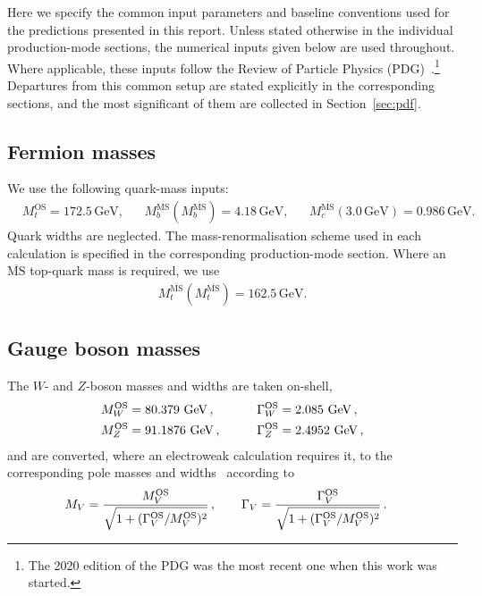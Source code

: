 Here we specify the common input parameters and baseline conventions used for
the predictions presented in this report. Unless stated otherwise in the
individual production-mode sections, the numerical inputs given below are used
throughout. Where applicable, these inputs follow the Review of Particle
Physics (PDG)~\cite{ParticleDataGroup:2020ssz}.\footnote{The 2020 edition of the
PDG was the most recent one when this work was started.} Departures from this
common setup are stated explicitly in the corresponding sections, and the most
significant of them are collected in Section~\ref{sec:pdf}.

\subsection{Fermion masses}
We use the following quark-mass inputs:
\begin{align}
\label{eq:qmasses}
&M_t^\mathrm{OS}=172.5\,\mathrm{GeV},&
&M_b^{\overline{\mathrm{MS}}}(M_b^{\overline{\mathrm{MS}}})=4.18\,\mathrm{GeV},&
&M_c^{\overline{\mathrm{MS}}}(3.0\,\mathrm{GeV})=0.986\,\mathrm{GeV}.&
\end{align}
Quark widths are neglected. The mass-renormalisation scheme used in each
calculation is specified in the corresponding production-mode section. Where an
$\overline{\mathrm{MS}}$ top-quark mass is required, we use
\begin{align}
M_t^{\overline{\mathrm{MS}}}(M_t^{\overline{\mathrm{MS}}})
=162.5\,\mathrm{GeV}.
\end{align}

\subsection{Gauge boson masses}

The $W$- and $Z$-boson masses and widths are taken on-shell,
\begin{align}
M^{\mathrm{OS}}_W &= 80.379~\mathrm{GeV}\,, \qquad &\Gamma^{\mathrm{OS}}_W &= 2.085~\mathrm{GeV}\,, \notag\\
M^{\mathrm{OS}}_Z &= 91.1876~\mathrm{GeV}\,, \qquad &\Gamma^{\mathrm{OS}}_Z &= 2.4952~\mathrm{GeV}\,,
\end{align}
and are converted, where an electroweak calculation requires it, to the
corresponding pole masses and widths~\cite{BARDIN1988539} according to
\begin{align}
M_V &=
\frac{M^{\mathrm{OS}}_V}{\sqrt{1+(\Gamma^{\mathrm{OS}}_V/M^{\mathrm{OS}}_V)^2}}\,,
\qquad
\Gamma_V =
\frac{\Gamma^{\mathrm{OS}}_V}{\sqrt{1+(\Gamma^{\mathrm{OS}}_V/M^{\mathrm{OS}}_V)^2}}\,.
\end{align}

